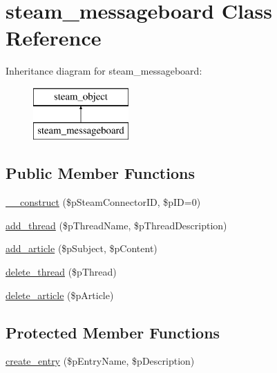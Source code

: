 \hypertarget{classsteam__messageboard}{
\section{steam\_\-messageboard Class Reference}
\label{classsteam__messageboard}
}
Inheritance diagram for steam\_\-messageboard:\begin{figure}[H]
\begin{center}
\leavevmode
\includegraphics[height=2.000000cm]{classsteam__messageboard}
\end{center}
\end{figure}
\subsection*{Public Member Functions}
\begin{DoxyCompactItemize}
\item 
\hyperlink{classsteam__messageboard_a650233d2f93c7a7252f77a643ae4da1b}{\_\-\_\-construct} (\$pSteamConnectorID, \$pID=0)
\item 
\hyperlink{classsteam__messageboard_a9b549e4b8292d8a9b1ac989adc4028ae}{add\_\-thread} (\$pThreadName, \$pThreadDescription)
\item 
\hyperlink{classsteam__messageboard_af1aab9f3b1f773af720ae4827d1629af}{add\_\-article} (\$pSubject, \$pContent)
\item 
\hyperlink{classsteam__messageboard_adde3955510245250a654a354399df7b9}{delete\_\-thread} (\$pThread)
\item 
\hyperlink{classsteam__messageboard_a0ae170ea6758aae1ec69d315a0a9de3f}{delete\_\-article} (\$pArticle)
\end{DoxyCompactItemize}
\subsection*{Protected Member Functions}
\begin{DoxyCompactItemize}
\item 
\hyperlink{classsteam__messageboard_a7218afe018c50881048a8e9567436407}{create\_\-entry} (\$pEntryName, \$pDescription)
\end{DoxyCompactItemize}



